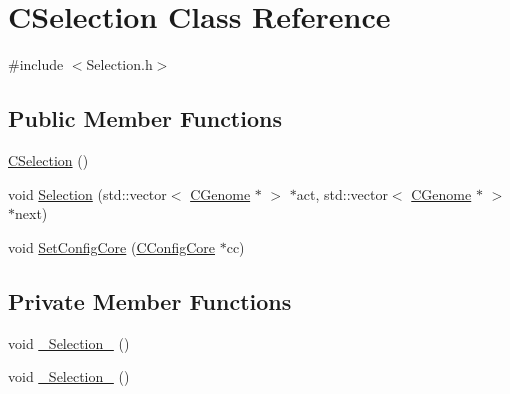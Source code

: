 \hypertarget{classCSelection}{
\section{CSelection Class Reference}
\label{classCSelection}
}


{\ttfamily \#include $<$Selection.h$>$}\subsection*{Public Member Functions}
\begin{DoxyCompactItemize}
\item 
\hyperlink{classCSelection_a13060ea1f1ec32b957acfaed41f2f8aa}{CSelection} ()
\item 
void \hyperlink{classCSelection_a1881ca413690f15e11e304f329f4fa4a}{Selection} (std::vector$<$ \hyperlink{classCGenome}{CGenome} $\ast$ $>$ $\ast$act, std::vector$<$ \hyperlink{classCGenome}{CGenome} $\ast$ $>$ $\ast$next)
\item 
void \hyperlink{classCSelection_a87662aebda82944ed7eb8702ca85107e}{SetConfigCore} (\hyperlink{classCConfigCore}{CConfigCore} $\ast$cc)
\end{DoxyCompactItemize}
\subsection*{Private Member Functions}
\begin{DoxyCompactItemize}
\item 
void \hyperlink{classCSelection_aad9d7729f69f7069f16d1e6d67fd95af}{\_\-Selection\_} ()
\item 
void \hyperlink{classCSelection_a5f042b58f50bf7713fb9160fe3929c32}{\_\-Selection\_} ()
\end{DoxyCompactItemize}
